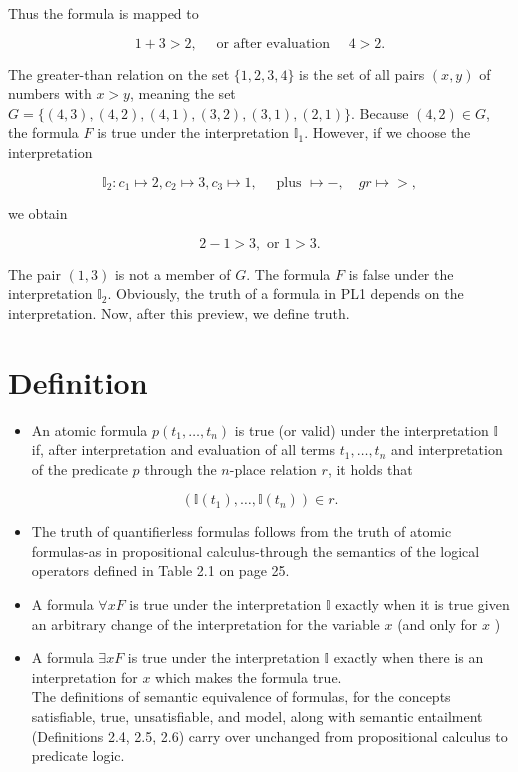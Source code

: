 \documentclass[10pt]{book}
\begin{document}
Thus the formula is mapped to

$$
1+3>2, \quad \text { or after evaluation } \quad 4>2 .
$$

The greater-than relation on the set $\{1,2,3,4\}$ is the set of all pairs $(x, y)$ of numbers with $x>y$, meaning the set $G=\{(4,3),(4,2),(4,1),(3,2),(3,1),(2,1)\}$. Because $(4,2) \in G$, the formula $F$ is true under the interpretation $\mathbb{I}_{1}$. However, if we choose the interpretation

$$
\mathbb{I}_{2}: c_{1} \mapsto 2, c_{2} \mapsto 3, c_{3} \mapsto 1, \quad \text { plus } \mapsto-, \quad g r \mapsto>,
$$

we obtain

$$
2-1>3, \text { or } 1>3 .
$$

The pair $(1,3)$ is not a member of $G$. The formula $F$ is false under the interpretation $\mathbb{I}_{2}$. Obviously, the truth of a formula in PL1 depends on the interpretation. Now, after this preview, we define truth.

\section{Definition}
\begin{itemize}
  \item An atomic formula $p\left(t_{1}, \ldots, t_{n}\right)$ is true (or valid) under the interpretation $\mathbb{I}$ if, after interpretation and evaluation of all terms $t_{1}, \ldots, t_{n}$ and interpretation of the predicate $p$ through the $n$-place relation $r$, it holds that
\end{itemize}
$$
\left(\mathbb{I}\left(t_{1}\right), \ldots, \mathbb{I}\left(t_{n}\right)\right) \in r .
$$

\begin{itemize}
  \item The truth of quantifierless formulas follows from the truth of atomic formulas-as in propositional calculus-through the semantics of the logical operators defined in Table 2.1 on page 25.
  \item A formula $\forall x F$ is true under the interpretation $\mathbb{I}$ exactly when it is true given an arbitrary change of the interpretation for the variable $x$ (and only for $x$ )
  \item A formula $\exists x F$ is true under the interpretation $\mathbb{I}$ exactly when there is an interpretation for $x$ which makes the formula true.\\
The definitions of semantic equivalence of formulas, for the concepts satisfiable, true, unsatisfiable, and model, along with semantic entailment (Definitions 2.4, 2.5, 2.6) carry over unchanged from propositional calculus to predicate logic.
\end{itemize}
\end{document}
